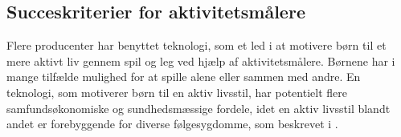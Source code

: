 \subsection{Succeskriterier for aktivitetsmålere} \label{succeskrav}
Flere producenter har benyttet teknologi, som et led i at motivere børn til et mere aktivt liv gennem spil og leg ved hjælp af aktivitetsmålere. Børnene har i mange tilfælde mulighed for at spille alene eller sammen med andre. %
\citep{Fuhu2015,PowerAbout2015} %
En teknologi, som motiverer børn til en aktiv livsstil, har potentielt flere samfundsøkonomiske og sundhedsmæssige fordele, idet en aktiv livsstil blandt andet er forebyggende for diverse følgesygdomme, som beskrevet i .

